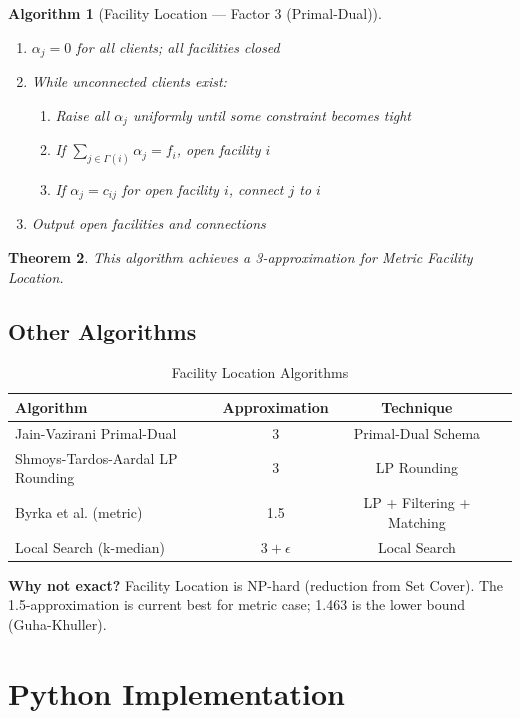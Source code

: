 \documentclass[11pt,oneside]{book}
\newtheorem{theorem}{Theorem}[chapter]
\newtheorem{algorithmdef}[theorem]{Algorithm}
\begin{document}
\begin{algorithmdef}[Facility Location — Factor 3 (Primal-Dual)]
\begin{enumerate}
    \item $\alpha_j = 0$ for all clients; all facilities closed
    \item While unconnected clients exist:
    \begin{enumerate}
        \item Raise all $\alpha_j$ uniformly until some constraint becomes tight
        \item If $\sum_{j \in \Gamma(i)} \alpha_j = f_i$, open facility $i$
        \item If $\alpha_j = c_{ij}$ for open facility $i$, connect $j$ to $i$
    \end{enumerate}
    \item Output open facilities and connections
\end{enumerate}
\end{algorithmdef}

\begin{theorem}
This algorithm achieves a 3-approximation for Metric Facility Location.
\end{theorem}

\subsection{Other Algorithms}

\begin{table}[H]
\centering
\caption{Facility Location Algorithms}
\begin{tabular}{lccc}
\toprule
Algorithm & Approximation & Technique \\
\midrule
Jain-Vazirani Primal-Dual & 3 & Primal-Dual Schema \\
Shmoys-Tardos-Aardal LP Rounding & 3 & LP Rounding \\
Byrka et al. (metric) & 1.5 & LP + Filtering + Matching \\
Local Search (k-median) & $3+\epsilon$ & Local Search \\
\bottomrule
\end{tabular}
\end{table}

\textbf{Why not exact?} Facility Location is NP-hard (reduction from Set Cover). The 1.5-approximation is current best for metric case; 1.463 is the lower bound (Guha-Khuller).

\section{Python Implementation}
\end{document}

